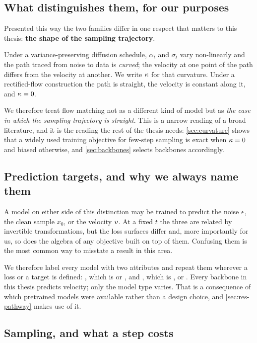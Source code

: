 \subsection{What distinguishes them, for our purposes}

Presented this way the two families differ in one respect that matters to
this thesis: \textbf{the shape of the sampling trajectory}.

Under a variance-preserving diffusion schedule, $\alpha_t$ and $\sigma_t$
vary non-linearly and the path traced from noise to data is \emph{curved};
the velocity at one point of the path differs from the velocity at another.
We write $\kappa$ for that curvature. Under a rectified-flow construction the
path is straight, the velocity is constant along it, and $\kappa = 0$.

We therefore treat flow matching not as a different kind of model but as
\emph{the case in which the sampling trajectory is straight}. This is a
narrow reading of a broad literature, and it is the reading the rest of the
thesis needs: \cref{sec:curvature} shows that a widely used training
objective for few-step sampling is exact when $\kappa = 0$ and biased
otherwise, and \cref{sec:backbones} selects backbones accordingly.

\subsection{Prediction targets, and why we always name them}

A model on either side of this distinction may be trained to predict the
noise $\epsilon$, the clean sample $x_0$, or the velocity $v$. At a
fixed $t$ the three are related by invertible transformations, but the loss
surfaces differ and, more importantly for us, so does the algebra of any
objective built on top of them. Confusing them is the most common way to
misstate a result in this area.

We therefore label every model with two attributes and repeat them wherever
a loss or a target is defined: , which is 
or , and , which is ,
 or . Every backbone in this thesis predicts
velocity; only the model type varies. That is a consequence of which
pretrained models were available rather than a design choice, and
\cref{sec:res-pathway} makes use of it.

\subsection{Sampling, and what a step costs}
\label{sec:rw-sampling}

